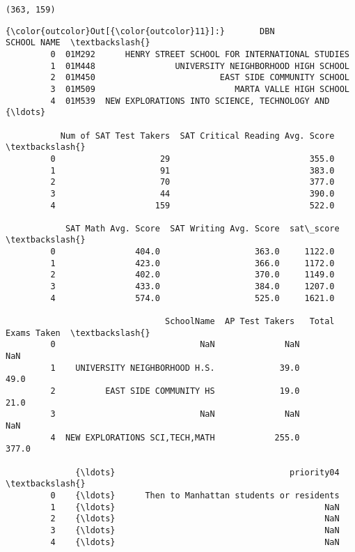 \documentclass[11pt]{article}
\begin{document}
    \begin{Verbatim}[commandchars=\\\{\}]
(363, 159)

    \end{Verbatim}

\begin{Verbatim}[commandchars=\\\{\}]
{\color{outcolor}Out[{\color{outcolor}11}]:}       DBN                                        SCHOOL NAME  \textbackslash{}
         0  01M292      HENRY STREET SCHOOL FOR INTERNATIONAL STUDIES   
         1  01M448                UNIVERSITY NEIGHBORHOOD HIGH SCHOOL   
         2  01M450                         EAST SIDE COMMUNITY SCHOOL   
         3  01M509                            MARTA VALLE HIGH SCHOOL   
         4  01M539  NEW EXPLORATIONS INTO SCIENCE, TECHNOLOGY AND {\ldots}   
         
           Num of SAT Test Takers  SAT Critical Reading Avg. Score  \textbackslash{}
         0                     29                            355.0   
         1                     91                            383.0   
         2                     70                            377.0   
         3                     44                            390.0   
         4                    159                            522.0   
         
            SAT Math Avg. Score  SAT Writing Avg. Score  sat\_score  \textbackslash{}
         0                404.0                   363.0     1122.0   
         1                423.0                   366.0     1172.0   
         2                402.0                   370.0     1149.0   
         3                433.0                   384.0     1207.0   
         4                574.0                   525.0     1621.0   
         
                                SchoolName  AP Test Takers   Total Exams Taken  \textbackslash{}
         0                             NaN              NaN                NaN   
         1    UNIVERSITY NEIGHBORHOOD H.S.             39.0               49.0   
         2          EAST SIDE COMMUNITY HS             19.0               21.0   
         3                             NaN              NaN                NaN   
         4  NEW EXPLORATIONS SCI,TECH,MATH            255.0              377.0   
         
              {\ldots}                                   priority04  \textbackslash{}
         0    {\ldots}      Then to Manhattan students or residents   
         1    {\ldots}                                          NaN   
         2    {\ldots}                                          NaN   
         3    {\ldots}                                          NaN   
         4    {\ldots}                                          NaN   
         

\end{Verbatim}
\end{document}
